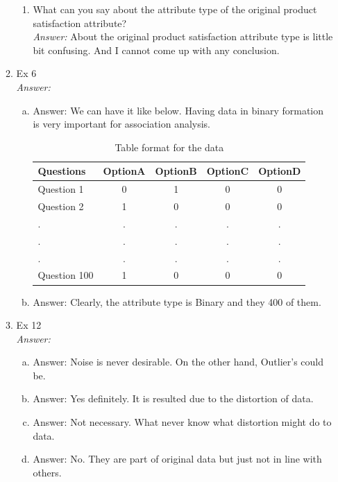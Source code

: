 \documentclass{article}
\begin{document}
\begin{enumerate}
\begin{enumerate}
\begin{enumerate}
				\item What can you say about the attribute type of the original product satisfaction attribute?\\
				\emph{Answer:} About the original product satisfaction attribute type is little bit confusing. And I cannot come up with any conclusion.
			\end{enumerate}
			\pagebreak
			\item Ex 6 \\
			\emph{Answer:}
				\begin{enumerate}[(a)]
					\item
					Answer: We can have it like below. Having data in binary formation is very important for association analysis.
					\begin{table}[h]
					\caption{Table format for the data} 
					\centering
					\begin{tabular}{l cccc}
						\hline
						Questions & OptionA & OptionB & OptionC & OptionD \\
						\hline
						Question 1 & 0 & 1 & 0 & 0 \\
						Question 2 & 1 & 0 & 0 & 0 \\
						. & . & . & . & .\\
						. & . & . & . & .\\
						. & . & . & . & .\\
						Question 100 & 1 & 0 & 0 & 0 \\
						\hline
					\end{tabular}	
				\end{table}	
				
					\item 
					Answer: Clearly, the attribute type is Binary and they 400 of them.
				\end{enumerate}

			\item Ex 12\\
			\emph{Answer:}
			\begin{enumerate}[(a)]
				\item 
				Answer: Noise is never desirable. On the other hand, Outlier's could be.
				
				\item 
				Answer: Yes definitely. It is resulted due to the distortion of data.
				
				\item 
				Answer: Not necessary. What never know what distortion might do to data.
				
				\item 
				Answer: No. They are part of original data but just not in line with others.
				

\end{enumerate}
\end{enumerate}
\end{enumerate}
\end{document}
